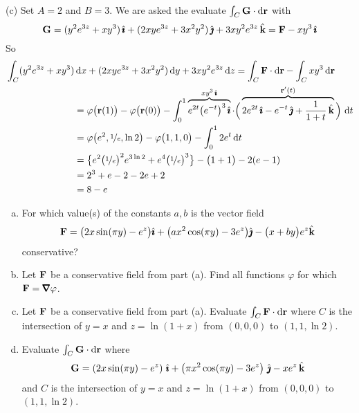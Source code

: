 \begin{solution}
(c) Set $A=2$ and $B=3$.
We are asked the evaluate $\int_C\mathbf{G}\cdot\mathrm{d}\mathbf{r}$ with
\begin{equation*}
\mathbf{G} = (y^2 e^{3z} + xy^3)\,\hat{\pmb{\imath}} + (2xye^{3z} + 3x^2 y^2 )\,\hat{\pmb{\jmath}} 
                 + 3xy^2 e^{3z}\,\hat{\mathbf{k}}
= \mathbf{F} - xy^3\,\hat{\pmb{\imath}}
\end{equation*}
So
\begin{align*}
&\int_C (y^2 e^{3z} + xy^3)\,\mathrm{d}x + (2xye^{3z} + 3x^2 y^2 )\,\mathrm{d}y 
                 + 3xy^2 e^{3z}\,\mathrm{d}z
= \int_C \mathbf{F}\cdot\mathrm{d}\mathbf{r} - \int_C xy^3\,\mathrm{d}\mathbf{r} \\
&\hskip1in = \varphi\big(\mathbf{r}(1)\big) - \varphi\big(\mathbf{r}(0)\big)
     -\int_0^1 \overbrace{e^{2t}\big(e^{-t}\big)^3\,\hat{\pmb{\imath}}}^{xy^3\,\hat{\pmb{\imath}}}\cdot
           \Big(\overbrace{2e^{2t}\,\hat{\pmb{\imath}}-e^{-t}\,\hat{\pmb{\jmath}}+\frac{1}{1+t}\,\hat{\mathbf{k}}}^
                {\mathbf{r}'(t)}\Big)\ \mathrm{d}t \\
&\hskip1in = \varphi\big(e^2,\nicefrac{1}{e},\ln 2\big) - \varphi\big(1,1,0\big)
              - \int_0^1 2e^t\,\mathrm{d}t \\
&\hskip1in = \big\{e^2\big(\nicefrac{1}{e}\big)^2 e^{3\ln 2}
                  +e^4\big(\nicefrac{1}{e}\big)^3\big\}
              -\big(1+1\big) -2(e-1) \\
&\hskip1in = 2^3 + e -2 -2e+2 \\
&\hskip1in = 8-e
\end{align*}
\end{solution}


\begin{question}[M317 2018A] \label{nonconserv2}%
\begin{enumerate} [(a)]
\item
For which value(s) of the constants $a,b$ is the vector 
field 
$$
\mathbf{F}=\big(2x\sin(\pi y)-e^z\big)\hat{\pmb{\imath}}
+\big(ax^2\cos(\pi y)-3e^z\big)\hat{\pmb{\jmath}}
-\big(x+by\big)e^z\hat{\mathbf{k}}
$$
conservative?

\item
Let $\mathbf{F}$ be a conservative field from part (a). Find all functions $\varphi$ for which $\vF=\vnabla\varphi$.

\item
Let $\mathbf{F}$ be a conservative field from part (a). 
Evaluate $\int_C \mathbf{F}\cdot \mathrm{d}\mathbf{r}$ where
$C$ is the intersection of $y=x$ and $z=\ln(1+x)$ from $(0,0,0)$ to
 $(1,1,\ln 2)$.

\item
Evaluate $\int_C \mathbf{G}\cdot \mathrm{d}\mathbf{r}$ where
$$
\mathbf{G}=\left(2x\sin(\pi y)-e^z\right)\,\hat{\pmb{\imath}}
+\left(\pi x^2\cos(\pi y)-3e^z\right)\,\hat{\pmb{\jmath}}
-xe^z\,\hat{\mathbf{k}}
$$
and $C$ is the intersection of $y=x$ and $z=\ln(1+x)$ from $(0,0,0)$ to
 $(1,1,\ln 2)$.
\end{enumerate}
\end{question}

